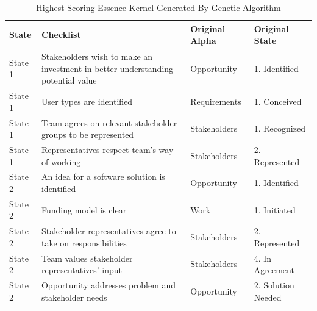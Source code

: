 \documentclass[conference]{IEEEtran}
\begin{document}
\begin{table}[h]
\caption{Highest Scoring Essence Kernel Generated By Genetic Algorithm}
\label{BestResults}
\centering
\begin{tabular}{|p{0.35in}|p{1.70in}|p{0.60in}|p{0.30in}|}
\hline
State & Checklist & Original \mbox{Alpha} & Original State \\ \hline
State 1 & Stakeholders wish to make an investment in better understanding potential value & Opportunity & 1. Identified \\ \hline
State 1 & User types are identified & Requirements & 1. Conceived \\ \hline
State 1 & Team agrees on relevant stakeholder groups to be represented & Stakeholders & 1. Recognized \\ \hline
State 1 & Representatives respect team's way of working  & Stakeholders & 2. Represented \\ \hline
State 2 & An idea for a software solution is identified & Opportunity & 1. Identified \\ \hline
State 2 & Funding model is clear & Work & 1. Initiated \\ \hline
State 2 & Stakeholder representatives agree to take on responsibilities & Stakeholders & 2. Represented \\  \hline
State 2 & Team values stakeholder representatives' input & Stakeholders & 4. In Agreement \\ \hline
State 2 & Opportunity addresses problem and stakeholder needs & Opportunity & 2. Solution Needed \\ \hline
\end{tabular}
\end{table}




\end{document}
